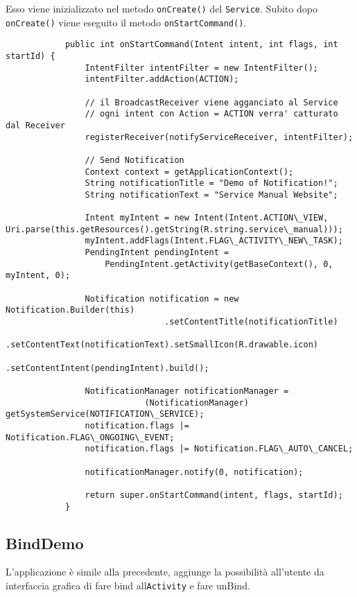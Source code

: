 		Esso viene inizializzato nel metodo \lstinline|onCreate()| del \lstinline|Service|.
		Subito dopo \lstinline|onCreate()| viene eseguito il metodo \lstinline|onStartCommand()|.
		\begin{lstlisting}
			public int onStartCommand(Intent intent, int flags, int startId) {
				IntentFilter intentFilter = new IntentFilter();
				intentFilter.addAction(ACTION);
				
				// il BroadcastReceiver viene agganciato al Service
				// ogni intent con Action = ACTION verra' catturato dal Receiver
				registerReceiver(notifyServiceReceiver, intentFilter);
				
				// Send Notification
				Context context = getApplicationContext();
				String notificationTitle = "Demo of Notification!";
				String notificationText = "Service Manual Website";
				
				Intent myIntent = new Intent(Intent.ACTION\_VIEW, Uri.parse(this.getResources().getString(R.string.service\_manual)));
				myIntent.addFlags(Intent.FLAG\_ACTIVITY\_NEW\_TASK);
				PendingIntent pendingIntent = 
					PendingIntent.getActivity(getBaseContext(), 0, myIntent, 0);
				
				Notification notification = new Notification.Builder(this)
								.setContentTitle(notificationTitle)
								.setContentText(notificationText).setSmallIcon(R.drawable.icon)
								.setContentIntent(pendingIntent).build();
				
				NotificationManager notificationManager = 
							(NotificationManager) getSystemService(NOTIFICATION\_SERVICE);
				notification.flags |= Notification.FLAG\_ONGOING\_EVENT;
				notification.flags |= Notification.FLAG\_AUTO\_CANCEL;
				
				notificationManager.notify(0, notification); 
				
				return super.onStartCommand(intent, flags, startId);
			}
		\end{lstlisting}
		

	\subsection{BindDemo}
		L'applicazione è simile alla precedente, aggiunge la possibilità all'utente da interfaccia grafica di fare bind all\lstinline|Activity| e fare unBind.
